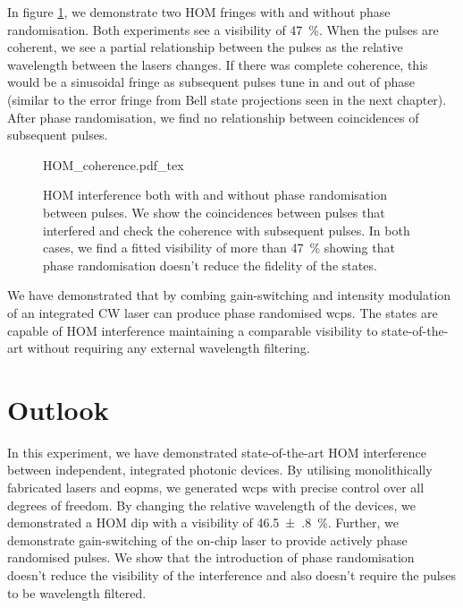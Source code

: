 In figure \ref{fig:HOM_coherence}, we demonstrate two \ac{HOM} fringes with and without phase randomisation. Both experiments see a visibility of \SI{47}{\percent}. When the pulses are coherent, we see a partial relationship between the pulses as the relative wavelength between the lasers changes. If there was complete coherence, this would be a sinusoidal fringe as subsequent pulses tune in and out of phase (similar to the error fringe from Bell state projections seen in the next chapter). After phase randomisation, we find no relationship between coincidences of subsequent pulses.

\begin{figure}[tp]
	\centering
	\tiny
	\def\svgwidth{\textwidth} 
	{HOM_coherence.pdf_tex}
	\caption[HOM interference with and without phase randomisation]{\ac{HOM} interference both with and without phase randomisation between pulses. We show the coincidences between pulses that interfered and check the coherence with subsequent pulses. In both cases, we find a fitted visibility of more than \SI{47}{\%} showing that phase randomisation doesn't reduce the fidelity of the states.}
	\label{fig:HOM_coherence}
\end{figure}

We have demonstrated that by combing gain-switching and intensity modulation of an integrated \ac{CW} laser can produce phase randomised \acp{wcp}. The states are capable of \ac{HOM} interference maintaining a comparable visibility to state-of-the-art without requiring any external wavelength filtering.

\section{Outlook}

In this experiment, we have demonstrated state-of-the-art \acl{HOM} interference between independent, integrated photonic devices. By utilising monolithically fabricated lasers and \acp{eopm}, we generated \acp{wcp} with precise control over all degrees of freedom. By changing the relative wavelength of the devices, we demonstrated a \ac{HOM} dip with a visibility of \SI{46.5(8)}{\%}. Further, we demonstrate gain-switching of the on-chip laser to provide actively phase randomised pulses. We show that the introduction of phase randomisation doesn't reduce the visibility of the interference and also doesn't require the pulses to be wavelength filtered.


